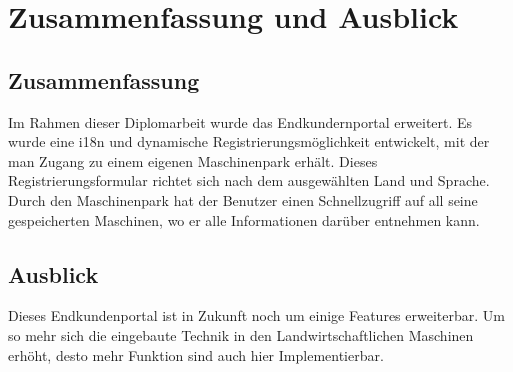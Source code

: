 \chapter{Zusammenfassung und Ausblick}
\section{Zusammenfassung}
Im Rahmen dieser Diplomarbeit wurde das Endkundernportal erweitert. Es wurde eine i18n und dynamische Registrierungsmöglichkeit entwickelt, mit der man Zugang zu einem eigenen Maschinenpark erhält. Dieses Registrierungsformular richtet sich nach dem ausgewählten Land und Sprache. Durch den Maschinenpark hat der Benutzer einen Schnellzugriff auf all seine gespeicherten Maschinen, wo er alle Informationen darüber entnehmen kann.
\section{Ausblick}
Dieses Endkundenportal ist in Zukunft noch um einige Features erweiterbar. Um so mehr sich die eingebaute Technik in den Landwirtschaftlichen Maschinen erhöht, desto mehr Funktion sind auch hier Implementierbar.